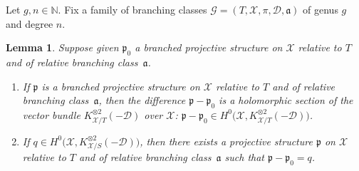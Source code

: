 \documentclass[10pt]{amsart}
\newcommand{\N}{\mathbb N}
\theoremstyle{definition}
\theoremstyle{plain}
\newtheorem{lemma}[definition]{Lemma}
\begin{document}
Let $g, n \in \N$.
Fix a family of branching classes $\mathcal G = (T, \mathcal X, \pi, \mathcal D, \mathfrak a)$ of genus $g$ and degree $n$.

\begin{lemma}\label{lemma_relative_bps_Schwarzian_derivative}
Suppose given $\mathfrak p_0$ a branched projective structure on $\mathcal X$ relative to $T$ and of relative branching class~$\mathfrak a$.
\begin{enumerate}
\item
If $\mathfrak p$ is a branched projective structure on $\mathcal X$ relative to $T$ and of relative branching class~$\mathfrak a$, then the difference $\mathfrak p-\mathfrak p_0$ is a holomorphic section of the vector bundle $K_{\mathcal X / T}^{\otimes 2}(-\mathcal D)$ over $\mathcal X$: $\mathfrak p-\mathfrak p_0 \in H^0\bigl(\mathcal X, K_{\mathcal X/T}^{\otimes 2}(-\mathcal D)\bigr)$.
\item
If $q \in H^0\bigl(\mathcal X, K_{\mathcal X/S}^{\otimes 2}(-\mathcal D)\bigr)$, then there exists a projective structure $\mathfrak p$ on $\mathcal X$ relative to $T$ and of relative branching class~$\mathfrak a$ such that $\mathfrak p - \mathfrak p_0 = q$.
\end{enumerate}
\end{lemma}
\end{document}
